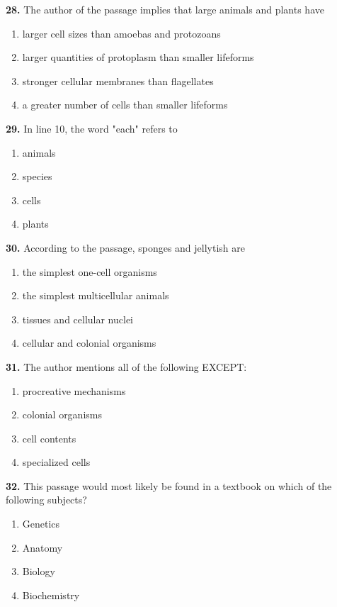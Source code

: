 \documentclass[12pt]{article}
\begin{document}
\par
\vspace{0.25\baselineskip}
\noindent\textbf{28.} The author of the passage implies that large animals and plants have
\begin{enumerate}[label=(\Alph*),leftmargin=*,itemsep=0.2em]
\item larger cell sizes than amoebas and protozoans
\item larger quantities of protoplasm than smaller lifeforms
\item stronger cellular membranes than flagellates
\item a greater number of cells than smaller lifeforms
\end{enumerate}
\par
\vspace{0.25\baselineskip}
\noindent\textbf{29.} In line 10, the word "each" refers to
\begin{enumerate}[label=(\Alph*),leftmargin=*,itemsep=0.2em]
\item animals
\item species
\item cells
\item plants
\end{enumerate}
\par
\vspace{0.25\baselineskip}
\noindent\textbf{30.} According to the passage, sponges and jellytish are
\begin{enumerate}[label=(\Alph*),leftmargin=*,itemsep=0.2em]
\item the simplest one-cell organisms
\item the simplest multicellular animals
\item tissues and cellular nuclei
\item cellular and colonial organisms
\end{enumerate}
\par
\vspace{0.25\baselineskip}
\noindent\textbf{31.} The author mentions all of the following EXCEPT:
\begin{enumerate}[label=(\Alph*),leftmargin=*,itemsep=0.2em]
\item procreative mechanisms
\item colonial organisms
\item cell contents
\item specialized cells
\end{enumerate}
\par
\vspace{0.25\baselineskip}
\noindent\textbf{32.} This passage would most likely be found in a textbook on which of the following subjects?
\begin{enumerate}[label=(\Alph*),leftmargin=*,itemsep=0.2em]
\item Genetics
\item Anatomy
\item Biology
\item Biochemistry
\end{enumerate}
\par
\vspace{0.25\baselineskip}
\end{document}
